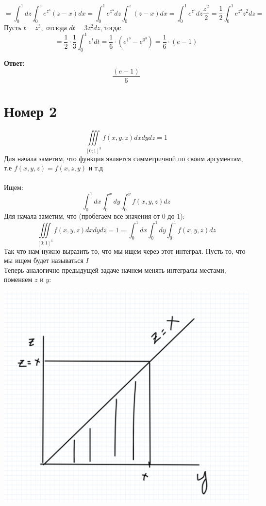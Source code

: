 \documentclass[a4paper,12pt]{article}
\begin{document}
\[
=  \int_0^1 dz \int_0^z e^{z^3} (z - x) dx =  \int_0^1  e^{z^3}  dz \int_0^z (z - x) dx = \int_0^1  e^{z^3}  dz \frac{z^2}{2} = \frac{1}{2} \int_0^1  e^{z^3} z^2  dz = 
\]
Пусть $t = z^3,$ отсюда $ dt = 3z^2 dz$, тогда:
\[
 = \frac{1}{2} \cdot \frac{1}{3} \int_0^1 e^t dt =\frac{1}{6} \cdot \left(e^{1^3} - e^{0^3}\right) = \frac{1}{6} \cdot (e - 1) 
\]
\begin{center}
\textbf{Ответ: } 
\[
 \frac{(e-1)}{6} 
\]
\end{center}
\clearpage
\section*{Номер 2}
\[
\iiint\limits_{[0;1]^3} f(x, y, z) dxdydz = 1
\]
Для начала заметим, что функция является симметричной по своим аргументам, т.е $f(x, y, z) = f(x, z, y)$ и т.д
\\\\
Ищем:
\[
\int_0^1 dx \int_0^x dy \int_0^y f(x, y, z) dz 
\]
Для начала заметим, что (пробегаем все значения от 0 до 1):
\[
\iiint\limits_{[0;1]^3} f(x, y, z) dxdydz = 1 = \int_0^1 dx \int_0^1 dy \int_0^1 f(x, y, z) dz 
\]
Так что нам нужно выразить то, что мы ищем через этот интеграл. Пусть то, что мы ищем будет называться $I$
\\
Теперь аналогично предыдущей задаче начнем менять интегралы местами, поменяем $z$ и $y$:
\begin{center}
\includegraphics[scale=0.2]{3.png}
\end{center}
\end{document}

